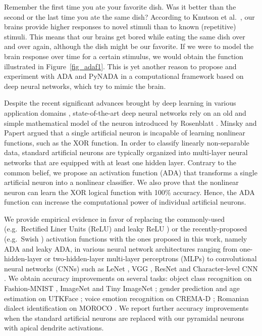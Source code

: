 \documentclass[pdflatex,sn-mathphys]{sn-jnl}
\theoremstyle{thmstyleone}
\theoremstyle{thmstyletwo}\newtheorem{example}{Example}\newtheorem{remark}{Remark}
\theoremstyle{thmstylethree}\newtheorem{definition}{Definition}\DeclareMathOperator{\sinc}{sinc}
\begin{document}
Remember the first time you ate your favorite dish. Was it better than the second or the last time you ate the same dish? According to Knutson et al.~\cite{Knutson-N-2006}, our brains provide higher responses to novel stimuli than to known (repetitive) stimuli. This means that our brains get bored while eating the same dish over and over again, although the dish might be our favorite. If we were to model the brain response over time for a certain stimulus, we would obtain the function illustrated in Figure~\ref{fig_adaf1}. This is yet another reason to propose and experiment with ADA and PyNADA in a computational framework based on deep neural networks, which try to mimic the brain.

Despite the recent significant advances brought by deep learning \citep{LeCun-N-2015} in various application domains \citep{Xu-CVIU-2017,Wang-N-2018}, state-of-the-art deep neural networks rely on an old and simple mathematical model of the neuron introduced by Rosenblatt \cite{Rosenblatt-PR-1958}. Minsky and Papert \cite{Minsky-MP-2017} argued that a single artificial neuron is incapable of learning nonlinear functions, such as the XOR function. In order to classify linearly non-separable data, standard artificial neurons are typically organized into multi-layer neural networks that are equipped with at least one hidden layer. Contrary to the common belief, we propose an activation function (ADA) that transforms a single artificial neuron into a nonlinear classifier. We also prove that the nonlinear neuron can learn the XOR logical function with 100\% accuracy. Hence, the ADA function can increase the computational power of individual artificial neurons.

We provide empirical evidence in favor of replacing the commonly-used (e.g.~Rectified Liner Units (ReLU) \citep{Nair-ICML-2010} and leaky ReLU \citep{Maas-WDLASL-2013}) or the recently-proposed (e.g.~Swish \citep{Ramachandran-ICLRW-2018}) activation functions \citep{Apicella-NN-2021,Dubey-NC-2021} with the ones proposed in this work, namely ADA and leaky ADA, in various neural network architectures ranging from one-hidden-layer or two-hidden-layer multi-layer perceptrons (MLPs) to convolutional neural networks (CNNs) such as LeNet \citep{LeCun-PI-1998}, VGG \citep{Simonyan-ICLR-2014}, ResNet \citep{He-CVPR-2016} and Character-level CNN \citep{Zhang-NIPS-2015}. We obtain accuracy improvements on several tasks: object class recognition on Fashion-MNIST \citep{Xiao-A-2017}, ImageNet \citep{Russakovsky-IJCV-2015} and Tiny ImageNet \citep{Russakovsky-IJCV-2015}; gender prediction and age estimation on UTKFace \citep{Zhang-CVPR-2017}; voice emotion recognition on CREMA-D \citep{Cao-TAC-2014}; Romanian dialect identification on MOROCO \citep{Butnaru-ACL-2019}. We report further accuracy improvements when the standard artificial neurons are replaced with our pyramidal neurons with apical dendrite activations.
\end{document}
